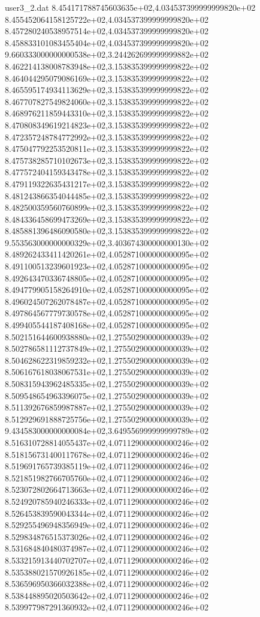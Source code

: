 \begin{filecontents}{user3_2.dat}
8.454171788745603635e+02,4.034537399999999820e+02
8.455452064158125722e+02,4.034537399999999820e+02
8.457280240538957514e+02,4.034537399999999820e+02
8.458833101083455404e+02,4.034537399999999820e+02
9.660333000000000538e+02,3.244262699999999882e+02
8.462214138008783948e+02,3.153835399999999822e+02
8.464044295079086169e+02,3.153835399999999822e+02
8.465595174934113629e+02,3.153835399999999822e+02
8.467707827549824060e+02,3.153835399999999822e+02
8.468976211859443310e+02,3.153835399999999822e+02
8.470808349619214823e+02,3.153835399999999822e+02
8.472357248784772992e+02,3.153835399999999822e+02
8.475047792253520811e+02,3.153835399999999822e+02
8.475738285710102673e+02,3.153835399999999822e+02
8.477572404159343478e+02,3.153835399999999822e+02
8.479119322635431217e+02,3.153835399999999822e+02
8.481243866354044485e+02,3.153835399999999822e+02
8.482500359560760899e+02,3.153835399999999822e+02
8.484336458699473269e+02,3.153835399999999822e+02
8.485881396486090580e+02,3.153835399999999822e+02
9.553563000000000329e+02,3.403674300000000130e+02
8.489262433411420261e+02,4.052871000000000095e+02
8.491100513239601923e+02,4.052871000000000095e+02
8.492643470336748805e+02,4.052871000000000095e+02
8.494779905158264910e+02,4.052871000000000095e+02
8.496024507262078487e+02,4.052871000000000095e+02
8.497864567779730578e+02,4.052871000000000095e+02
8.499405544187408168e+02,4.052871000000000095e+02
8.502151644600938880e+02,1.275502900000000039e+02
8.502786581112737849e+02,1.275502900000000039e+02
8.504628622319859232e+02,1.275502900000000039e+02
8.506167618038067531e+02,1.275502900000000039e+02
8.508315943962485335e+02,1.275502900000000039e+02
8.509548654963396075e+02,1.275502900000000039e+02
8.511392676859987887e+02,1.275502900000000039e+02
8.512929691888725756e+02,1.275502900000000039e+02
9.434583000000000084e+02,3.649556999999999789e+02
8.516310728814055437e+02,4.071129000000000246e+02
8.518156731400117678e+02,4.071129000000000246e+02
8.519691765739385119e+02,4.071129000000000246e+02
8.521851982766705760e+02,4.071129000000000246e+02
8.523072802664713663e+02,4.071129000000000246e+02
8.524920785940246333e+02,4.071129000000000246e+02
8.526453839590043344e+02,4.071129000000000246e+02
8.529255496948356949e+02,4.071129000000000246e+02
8.529834876515373026e+02,4.071129000000000246e+02
8.531684840480374987e+02,4.071129000000000246e+02
8.533215913440702707e+02,4.071129000000000246e+02
8.535388021570926185e+02,4.071129000000000246e+02
8.536596950366032388e+02,4.071129000000000246e+02
8.538448895020503642e+02,4.071129000000000246e+02
8.539977987291360932e+02,4.071129000000000246e+02

\end{filecontents}
